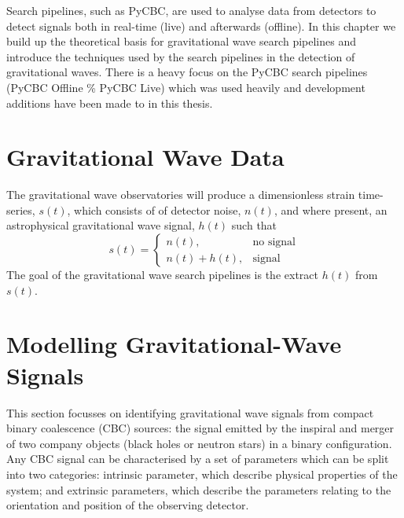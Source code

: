 



Search pipelines, such as PyCBC, are used to analyse data from \gw detectors to detect \gw signals both in real-time (live) and afterwards (offline). In this chapter we build up the theoretical basis for gravitational wave search pipelines and introduce the techniques used by the search pipelines in the detection of gravitational waves. There is a heavy focus on the PyCBC search pipelines (PyCBC Offline \% PyCBC Live) which was used heavily and development additions have been made to in this thesis.

\section{\label{2:sec:gw-data}Gravitational Wave Data}

The gravitational wave observatories will produce a dimensionless strain time-series, $s(t)$, which consists of of detector noise, $n(t)$, and where present, an astrophysical gravitational wave signal, $h(t)$ such that
%
\begin{equation}
    s(t) =
    \begin{cases}
        n(t), & \text{no signal} \\
        n(t) + h(t), & \text{signal}
    \end{cases}
\end{equation}
%
The goal of the gravitational wave search pipelines is the extract $h(t)$ from $s(t)$.

\section{\label{2:sec:signal-model}Modelling Gravitational-Wave Signals}


This section focusses on identifying gravitational wave signals from compact binary coalescence (CBC) sources: the signal emitted by the inspiral and merger of two company objects (black holes or neutron stars) in a binary configuration. Any CBC signal can be characterised by a set of parameters which can be split into two categories: intrinsic parameter, which describe physical properties of the system; and extrinsic parameters, which describe the parameters relating to the orientation and position of the observing detector.

